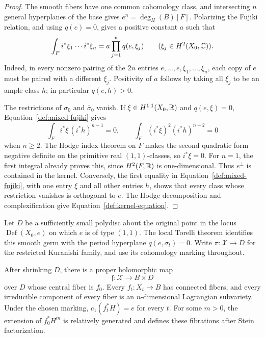 \begin{proof}
The smooth fibers have one common cohomology class, and intersecting
$n$ general hyperplanes of the base gives
$e^n=\deg_H(B)[F]$.  Polarizing the Fujiki relation, and using $q(e)=0$,
gives a positive constant $a$ such that
\begin{equation}\label{def:mixed-fujiki}
 \int_F i^*\xi_1\cdots i^*\xi_n
       =a\prod_{j=1}^n q(e,\xi_j)
       \qquad(\xi_j\in H^2(X_0,\mathbb C)).
\end{equation}
Indeed, in every nonzero pairing of the $2n$ entries
$e,\ldots,e,\xi_1,\ldots,\xi_n$, each copy of $e$ must be paired
with a different $\xi_j$.  Positivity of $a$ follows by taking all
$\xi_j$ to be an ample class $h$; in particular $q(e,h)>0$.

The restrictions of $\sigma_0$ and $\bar\sigma_0$ vanish.  If
$\xi\in H^{1,1}(X_0,\mathbb R)$ and $q(e,\xi)=0$, Equation~\eqref{def:mixed-fujiki}
gives
\[
 \int_F i^*\xi\,(i^*h)^{n-1}=0,
 \qquad
 \int_F(i^*\xi)^2(i^*h)^{n-2}=0
\]
when $n\geq2$.  The Hodge index theorem on $F$ makes the second
quadratic form negative definite on the primitive real $(1,1)$-classes,
so $i^*\xi=0$.  For $n=1$, the first integral already proves this,
since $H^2(F,\mathbb R)$ is one-dimensional.  Thus $e^\perp$ is contained
in the kernel.  Conversely, the first equality in
Equation~\eqref{def:mixed-fujiki}, with one entry $\xi$ and all other
entries $h$, shows that every class whose restriction vanishes is
orthogonal to $e$.  The Hodge decomposition and complexification give
Equation~\eqref{def:kernel-equation}.
\end{proof}

Let $D$ be a sufficiently small polydisc about the original point in the
locus $\operatorname{Def}(X_0,e)$ on which $e$ is of type $(1,1)$.
The local Torelli theorem identifies this smooth germ with the period
hyperplane $q(e,\sigma_t)=0$.  Write
$\pi:\mathcal X\to D$ for the restricted Kuranishi family, and use its
cohomology marking throughout.

\begin{proposition}\label{def:fixed-base}
After shrinking $D$, there is a proper holomorphic map
\[
             \mathfrak f:\mathcal X\longrightarrow B\times D
\]
over $D$ whose central fiber is $f_0$.  Every
$f_t:X_t\to B$ has connected fibers, and every irreducible component
of every fiber is an $n$-dimensional Lagrangian subvariety.
Under the chosen marking, $c_1(f_t^*H)=e$ for every $t$.
For some $m>0$, the extension of $f_0^*H^m$ is relatively generated
and defines these fibrations after Stein factorization.
\end{proposition}

